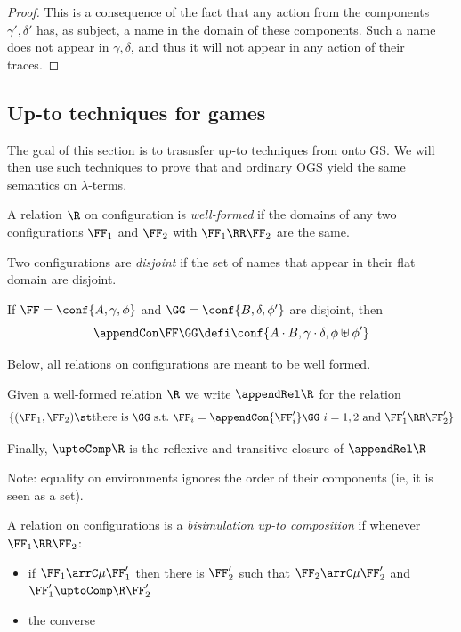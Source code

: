 \begin{proof}
This is a consequence of the fact that any action from the components $\gamma', \delta'$ 
has, as subject, a name in the domain of these components. Such a name does not appear in $
\gamma , \delta $, and thus it will not appear in any action of their traces.  
\end{proof} 

\ifcutCBNLMCS
\subsection{Up-to techniques for games}
\label{ss:CBNupto_games}

The goal of this section is to trasnsfer up-to techniques from 
\piI  onto GS. We will then use such techniques to prove that
\COGS and ordinary OGS yield the same semantics on
$\lambda$-terms. 

 

A relation $\R$ on configuration is \emph{well-formed} 
if  the domains of any two configurations 
$\FF_1$ and $ \FF_2$
with  $\FF_1 \RR \FF_2$  are the same.

Two configurations are \emph{disjoint} if the set of names that appear
in their flat  domain are disjoint. 

If 
$ \FF = \conf{ A , \gamma,\phi }$
and 
$ \GG = \conf{ B , \delta ,\phi' }$
are disjoint, then 
\[ \appendCon \FF \GG  \defi
 \conf{ A \cdot B , \gamma \cdot \delta,\phi\uplus \phi' }
 \] 

Below, all relations on configurations are meant to be well formed. 

Given a well-formed relation $\R$ we write
$\appendRel \R $ for the relation
\[ 
\{ (\FF_1,\FF_2) \st
\mbox{there is $\GG$ s.t.\ }
 \FF_i = \appendCon{\FF'_i}\GG   \mbox{ $i=1,2$}  \mbox{ and }  \FF'_1\RR \FF'_2\}
\]


Finally, $\uptoComp \R $ is the reflexive and transitive closure of 
$\appendRel \R $

Note: equality on environments ignores the order of their components
(ie, it is  seen as a set).


\begin{definition}
\label{d:uptoComp-cbn}
A relation on configurations is a \emph{bisimulation up-to
  composition} if whenever $\FF_1 \RR \FF_2$: 
\begin{itemize}
\item if $\FF_1 \arrC\mu \FF_1'  $ then there is $\FF_2' $ such that 
$\FF_2 \arrC\mu \FF_2'  $ and 
$\FF'_1 \uptoComp \R \FF'_2$

\item  the converse
\end{itemize}  
\end{definition} 

